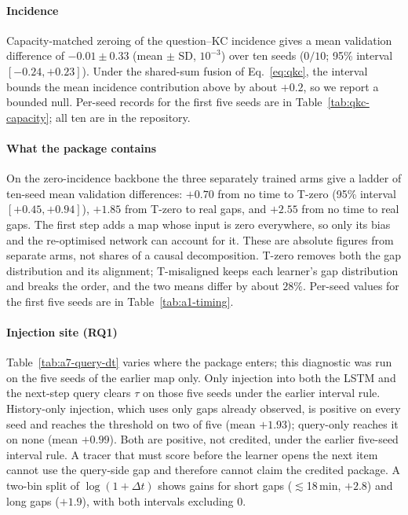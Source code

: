 \documentclass[review,12pt]{elsarticle}
\begin{document}
\paragraph{Incidence}
Capacity-matched zeroing of the question--KC incidence gives a mean
validation difference of $-0.01{\pm}0.33$ (mean ${\pm}$ SD,
$10^{-3}$) over ten seeds ($0/10$; 95\%
interval $[{-}0.24,{+}0.23]$). Under the shared-sum fusion of
Eq.~\eqref{eq:qkc}, the interval bounds the mean incidence contribution
above by about $+0.2$, so we report a bounded null. Per-seed records
for the first five seeds are in Table~\ref{tab:qkc-capacity}; all ten
are in the repository.

\paragraph{What the package contains}
On the zero-incidence backbone the three separately trained arms give a
ladder of ten-seed mean validation differences: $+0.70$ from no time to
T-zero (95\% interval $[{+}0.45,{+}0.94]$), $+1.85$ from T-zero
to real gaps, and $+2.55$ from no time to real gaps. The first step
adds a map whose input is zero everywhere, so only its bias and the
re-optimised network can account for it. These are absolute figures
from separate arms, not shares of a causal decomposition. T-zero removes
both the gap distribution and its alignment; T-misaligned keeps each
learner's gap distribution and breaks the order, and the two means
differ by about $28\%$. Per-seed values for the first five seeds are in
Table~\ref{tab:a1-timing}.

\paragraph{Injection site (RQ1)}
Table~\ref{tab:a7-query-dt} varies where the package enters; this
diagnostic was run on the five seeds of the earlier map only. Only
injection into both the LSTM and the next-step query clears $\tau$ on
those five seeds under the earlier interval rule.
History-only injection, which uses only gaps already observed, is
positive on every seed and reaches the threshold on two of five (mean
$+1.93$); query-only reaches it on none (mean $+0.99$). Both are
positive, not credited, under the earlier five-seed interval rule. A
tracer that must score before the learner opens the next item cannot use
the query-side gap and therefore cannot claim the credited package. A two-bin split of
$\log(1{+}\Delta t)$ shows gains for short gaps ($\lesssim$18\,min,
$+2.8$) and long gaps ($+1.9$), with both intervals excluding $0$.
\end{document}
